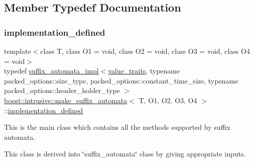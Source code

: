 \subsection{Member Typedef Documentation}
\mbox{\label{structboost_1_1intrusive_1_1make__suffix__automata_a7c449bd4e565f9b3bcdea384f96b6bd6}} 
\subsubsection{\texorpdfstring{implementation\+\_\+defined}{implementation\_defined}}
{\footnotesize\ttfamily template$<$class T, class O1 = void, class O2 = void, class O3 = void, class O4 = void$>$ \\
typedef \hyperlink{classboost_1_1intrusive_1_1suffix__automata__impl}{suffix\+\_\+automata\+\_\+impl}$<$\hyperlink{structboost_1_1intrusive_1_1make__suffix__automata_a167b4c7e5a6fb43ca4238d252d8e823b}{value\+\_\+traits}, typename packed\+\_\+options\+::size\+\_\+type, packed\+\_\+options\+::constant\+\_\+time\+\_\+size, typename packed\+\_\+options\+::header\+\_\+holder\+\_\+type $>$ \hyperlink{structboost_1_1intrusive_1_1make__suffix__automata}{boost\+::intrusive\+::make\+\_\+suffix\+\_\+automata}$<$ T, O1, O2, O3, O4 $>$\+::\hyperlink{structboost_1_1intrusive_1_1make__suffix__automata_a7c449bd4e565f9b3bcdea384f96b6bd6}{implementation\+\_\+defined}}


\begin{DoxyItemize}
\item This is the main class which contains all the methods supported by suffix automata. 
\item This class is derived into \char`\"{}suffix\+\_\+automata\char`\"{} class by giving appropriate inputs. 
\end{DoxyItemize}\mbox{\label{structboost_1_1intrusive_1_1make__suffix__automata_a33c2a1d1a4da2d12cb62017e1b8a86ae}} 
